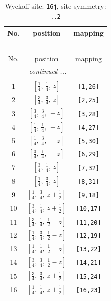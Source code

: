 \documentclass[fleqn,8pt]{jsarticle}
\begin{document}
\begin{longtable}{ccc}
\caption{Wyckoff site: {\tt 16j}, site symmetry: {\tt ..2}}
 \\
 \hline \hline
No. & position & mapping \\ \hline \endfirsthead

\multicolumn{2}{l}{\tablename\ \thetable{}} \\
 \hline \hline
No. & position & mapping \\ \hline \endhead

 \hline \hline
\multicolumn{2}{r}{\footnotesize\it continued ...} \\ \endfoot

 \hline \hline
\multicolumn{2}{r}{} \\ \endlastfoot

1 & $\left[ \frac{1}{4},\, \frac{1}{4},\, z \right]$ & {\tt [1,26]} \\ \hline
2 & $\left[ \frac{3}{4},\, \frac{3}{4},\, z \right]$ & {\tt [2,25]} \\ \hline
3 & $\left[ \frac{3}{4},\, \frac{3}{4},\, - z \right]$ & {\tt [3,28]} \\ \hline
4 & $\left[ \frac{1}{4},\, \frac{1}{4},\, - z \right]$ & {\tt [4,27]} \\ \hline
5 & $\left[ \frac{1}{4},\, \frac{3}{4},\, - z \right]$ & {\tt [5,30]} \\ \hline
6 & $\left[ \frac{3}{4},\, \frac{1}{4},\, - z \right]$ & {\tt [6,29]} \\ \hline
7 & $\left[ \frac{3}{4},\, \frac{1}{4},\, z \right]$ & {\tt [7,32]} \\ \hline
8 & $\left[ \frac{1}{4},\, \frac{3}{4},\, z \right]$ & {\tt [8,31]} \\ \hline
9 & $\left[ \frac{1}{4},\, \frac{3}{4},\, z + \frac{1}{2} \right]$ & {\tt [9,18]} \\ \hline
10 & $\left[ \frac{3}{4},\, \frac{1}{4},\, z + \frac{1}{2} \right]$ & {\tt [10,17]} \\ \hline
11 & $\left[ \frac{3}{4},\, \frac{1}{4},\, \frac{1}{2} - z \right]$ & {\tt [11,20]} \\ \hline
12 & $\left[ \frac{1}{4},\, \frac{3}{4},\, \frac{1}{2} - z \right]$ & {\tt [12,19]} \\ \hline
13 & $\left[ \frac{1}{4},\, \frac{1}{4},\, \frac{1}{2} - z \right]$ & {\tt [13,22]} \\ \hline
14 & $\left[ \frac{3}{4},\, \frac{3}{4},\, \frac{1}{2} - z \right]$ & {\tt [14,21]} \\ \hline
15 & $\left[ \frac{3}{4},\, \frac{3}{4},\, z + \frac{1}{2} \right]$ & {\tt [15,24]} \\ \hline
16 & $\left[ \frac{1}{4},\, \frac{1}{4},\, z + \frac{1}{2} \right]$ & {\tt [16,23]} \\
\end{longtable}
\end{document}
